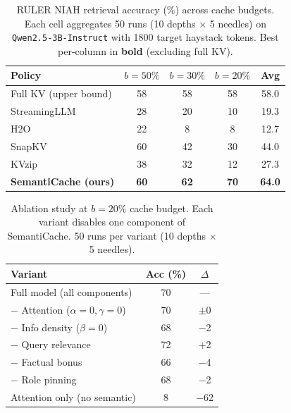 
\begin{table}[t]
\caption{RULER NIAH retrieval accuracy (\%) across cache budgets.
Each cell aggregates 50 runs (10 depths $\times$ 5 needles) on
\texttt{Qwen2.5-3B-Instruct} with 1800 target haystack tokens.
Best per-column in \textbf{bold} (excluding full KV).}
\label{tab:main}
\centering
\begin{tabular}{lcccc}
\toprule
Policy & $b{=}50\%$ & $b{=}30\%$ & $b{=}20\%$ & Avg \\
\midrule
Full KV (upper bound)          & 58 & 58 & 58 & 58.0 \\
\midrule
StreamingLLM~\cite{xiao2023streamingllm}  & 28 & 20 & 10 & 19.3 \\
H2O~\cite{zhang2023h2o}                   & 22 &  8 &  8 & 12.7 \\
SnapKV~\cite{li2024snapkv}                & 60 & 42 & 30 & 44.0 \\
KVzip~\cite{he2025kvzip}                  & 38 & 32 & 12 & 27.3 \\
\textbf{SemantiCache (ours)}              & \textbf{60} & \textbf{62} & \textbf{70} & \textbf{64.0} \\
\bottomrule
\end{tabular}
\end{table}



\begin{table}[t]
\caption{Ablation study at $b{=}20\%$ cache budget. Each variant
disables one component of SemantiCache. 50 runs per variant
(10 depths $\times$ 5 needles).}
\label{tab:ablation}
\centering
\begin{tabular}{lcc}
\toprule
Variant & Acc (\%) & $\Delta$ \\
\midrule
Full model (all components)     & 70 & --- \\
\midrule
$-$ Attention ($\alpha{=}0, \gamma{=}0$)       & 70 & $\pm$0 \\
$-$ Info density ($\beta{=}0$)                  & 68 & $-$2 \\
$-$ Query relevance                             & 72 & $+$2 \\
$-$ Factual bonus                               & 66 & $-$4 \\
$-$ Role pinning                                & 68 & $-$2 \\
\midrule
Attention only (no semantic)    &  8 & $-$62 \\
\bottomrule
\end{tabular}
\end{table}


